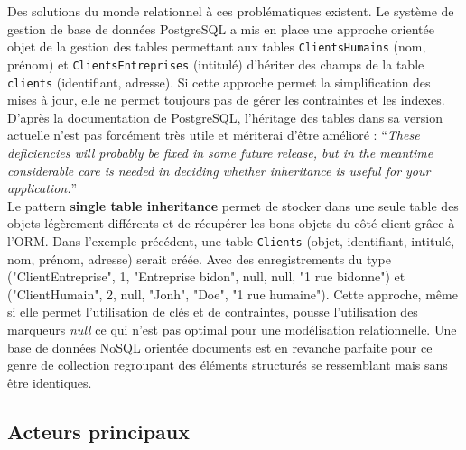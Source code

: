   \vspace{10px}

  Des solutions du monde relationnel à ces problématiques existent. Le système de gestion de base de données PostgreSQL a mis en place une approche orientée objet de la gestion des tables permettant aux tables \texttt{ClientsHumains} (nom, prénom) et \texttt{ClientsEntreprises} (intitulé) d'hériter des champs de la table \texttt{clients} (identifiant, adresse). Si cette approche permet la simplification des mises à jour, elle ne permet toujours pas de gérer les contraintes et les indexes. D'après la documentation de PostgreSQL, l'héritage des tables dans sa version actuelle n'est pas forcément très utile et mériterai d'être amélioré :
  \enquote{\textit{These deficiencies will probably be fixed in some future release, but in the meantime considerable care is needed in deciding whether inheritance is useful for your application.}}\cite{Postgre_inheritance}\\

  Le pattern \textbf{single table inheritance} permet de stocker dans une seule table des objets légèrement différents et de récupérer les bons objets du côté client grâce à l'ORM. Dans l'exemple précédent, une table \texttt{Clients} (objet, identifiant, intitulé, nom, prénom, adresse) serait créée. Avec des enregistrements du type ("ClientEntreprise", 1, "Entreprise bidon", null, null, "1 rue bidonne") et ("ClientHumain", 2, null, "Jonh", "Doe", "1 rue humaine"). Cette approche, même si elle permet l'utilisation de clés et de contraintes, pousse l'utilisation des marqueurs \textit{null} ce qui n'est pas optimal pour une modélisation relationnelle. Une base de données NoSQL orientée documents est en revanche parfaite pour ce genre de collection regroupant des éléments structurés se ressemblant mais sans être identiques.

\subsection{Acteurs principaux}

